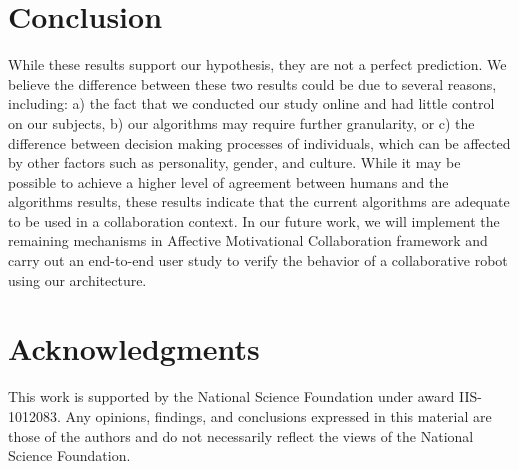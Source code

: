 \documentclass{article}
\begin{document}
\vspace{-2mm}
\section{Conclusion}
\vspace{-1mm}
While these results support our hypothesis, they are not a perfect prediction.
We believe the difference between these two results could be due to several
reasons, including: a) the fact that we conducted our study online and had
little control on our subjects, b) our algorithms may require further
granularity, or c) the difference between decision making processes of
individuals, which can be affected by other factors such as personality, gender,
and culture. While it may be possible to achieve a higher level of agreement
between humans and the algorithms results, these results indicate that the
current algorithms are adequate to be used in a collaboration context. In our
future work, we will implement the remaining mechanisms in Affective
Motivational Collaboration framework and carry out an end-to-end user study to
verify the behavior of a collaborative robot using our architecture.

\vspace*{-3mm}
\section*{Acknowledgments}
\vspace{-2mm}
{\fontsize{8.2}{9}\selectfont This work is supported by the National Science
Foundation under award IIS-1012083. Any opinions, findings, and conclusions
expressed in this material are those of the authors and do not necessarily
reflect the views of the National Science Foundation.}



\end{document}
